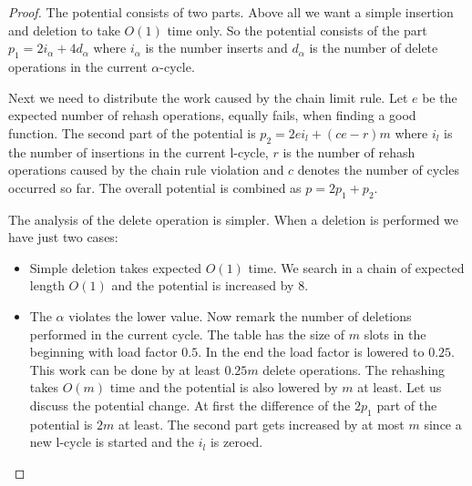 \begin{proof}
The potential consists of two parts. Above all we want a simple insertion and deletion to take $O(1)$ time only. So the potential consists of the part $p_1 = 2i_{\alpha} + 4d_{\alpha}$ where $i_{\alpha}$ is the number inserts and $d_{\alpha}$ is the number of delete operations in the current $\alpha$-cycle. 

Next we need to distribute the work caused by the chain limit rule. Let $e$ be the expected number of rehash operations, equally fails, when finding a good function. The second part of the potential is $p_2 = 2ei_{l} + (ce - r) m$ where $i_l$ is the number of insertions in the current l-cycle, $r$ is the number of rehash operations caused by the chain rule violation and $c$ denotes the number of cycles occurred so far. The overall potential is combined as $p = 2p_1 + p_2$.

The analysis of the delete operation is simpler. When a deletion is performed we have just two cases:
\begin{itemize}
\item Simple deletion takes expected $O(1)$ time. We search in a chain of expected length $O(1)$ and the potential is increased by $8$.
\item The $\alpha$ violates the lower value. Now remark the number of deletions performed in the current cycle. The table has the size of $m$ slots in the beginning with load factor $0.5$. In the end the load factor is lowered to $0.25$. This work can be done by at least $0.25 m$ delete operations. The rehashing takes $O(m)$ time and the potential is also lowered by $m$ at least. Let us discuss the potential change. At first the difference of the $2p_1$ part of the potential is $2m$ at least. The second part gets increased by at most $m$ since a new l-cycle is started and the $i_l$ is zeroed.
\end{itemize}


\end{proof}
